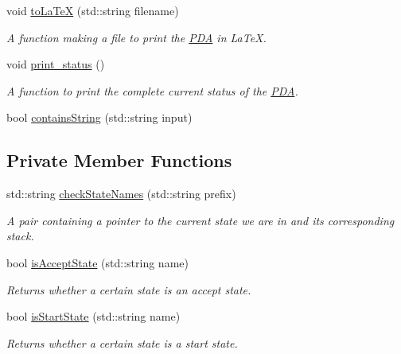 \begin{DoxyCompactItemize}
void \hyperlink{classPDA_1_1PDA_a741e99b5d9e53e32d6808bf83dde96b2}{to\-La\-Te\-X} (std\-::string filename)
\begin{DoxyCompactList}\small\item\em \-A function making a file to print the \hyperlink{classPDA_1_1PDA}{\-P\-D\-A} in \-La\-Te\-X. \end{DoxyCompactList}\item 
void \hyperlink{classPDA_1_1PDA_a04c7164ddd8488e074741259cb9a8db4}{print\-\_\-status} ()
\begin{DoxyCompactList}\small\item\em \-A function to print the complete current status of the \hyperlink{classPDA_1_1PDA}{\-P\-D\-A}. \end{DoxyCompactList}\item 
bool \hyperlink{classPDA_1_1PDA_a7f6cb548bcd3860306e3c96e0041ffd4}{contains\-String} (std\-::string input)
\end{DoxyCompactItemize}
\subsection*{\-Private \-Member \-Functions}
\begin{DoxyCompactItemize}
\item 
std\-::string \hyperlink{classPDA_1_1PDA_af707f305d9b16dbc3dcb686a3f63fca4}{check\-State\-Names} (std\-::string prefix)
\begin{DoxyCompactList}\small\item\em \-A pair containing a pointer to the current state we are in and its corresponding stack. \end{DoxyCompactList}\item 
bool \hyperlink{classPDA_1_1PDA_aa245040d766419cc4e9ddcd825ab6ca5}{is\-Accept\-State} (std\-::string name)
\begin{DoxyCompactList}\small\item\em \-Returns whether a certain state is an accept state. \end{DoxyCompactList}\item 
bool \hyperlink{classPDA_1_1PDA_a37329b27d0ac02e944d1160a4462fbce}{is\-Start\-State} (std\-::string name)
\begin{DoxyCompactList}\small\item\em \-Returns whether a certain state is a start state. \end{DoxyCompactList}\end{DoxyCompactItemize}
